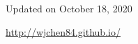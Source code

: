 \documentclass[UTF8,fontset=none]{res}
\begin{document}
\begin{resume}
%

\vspace{0.3in}
\centerline{\footnotesize Updated on October 18, 2020}
\centerline{\footnotesize \url{http://wjchen84.github.io/}}

\end{resume}
\end{document}
